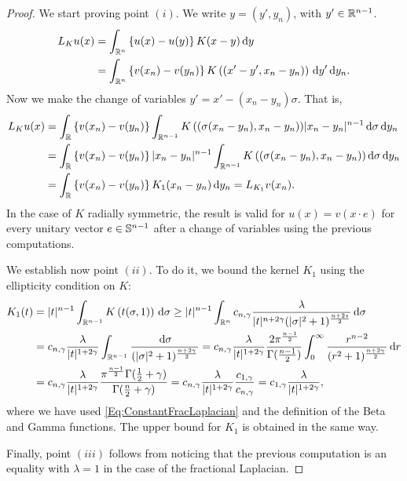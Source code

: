 \begin{proof}
	We start proving point $(i)$. We write $y=(y',y_n)$, with $y'\in \mathbb{R}^{n-1}$.
	\begin{align*}
	L_K u(x) &= \int_{\mathbb{R}^n} \left\{ u(x)-u(y) \right\} K(x-y) \,\mathrm{d} y \\
	&=\int_{\mathbb{R}^n} \left\{ v(x_n)-v(y_n) \right\} K\left((x'-y',x_n-y_n)\right) \,\mathrm{d} y' \,\mathrm{d} y_n.
	\end{align*}
	Now we make the change of variables $y' = x'-(x_n-y_n)\sigma$. That is,
	\begin{align*}
	L_K u(x) &= \int_{\mathbb{R}} \left\{ v(x_n)-v(y_n) \right\} \int_{\mathbb{R}^{n-1}} K\left((\sigma(x_n-y_n),x_n-y_n\right)) |x_n-y_n|^{n-1} \,\mathrm{d} \sigma \,\mathrm{d} y_n \\
	&= \int_{\mathbb{R}} \left\{ v(x_n)-v(y_n) \right\} |x_n-y_n|^{n-1} \int_{\mathbb{R}^{n-1}} K\left((\sigma(x_n-y_n),x_n-y_n\right)) \,\mathrm{d}\sigma \,\mathrm{d} y_n \\
	&= \int_{\mathbb{R}} \left\{ v(x_n)-v(y_n) \right\} K_1(x_n-y_n ) \,\mathrm{d} y_n = L_{K_1}v(x_n).
	\end{align*}
	In the case of $K$ radially symmetric, the result is valid for $u(x) = v(x\cdot e)$ for every unitary vector $e\in \mathbb{S}^{n-1}$ after a change of variables using the previous computations.
	
	We establish now point $(ii)$. To do it, we bound the kernel $K_1$ using the ellipticity condition on $K$:
	\begin{align*}
	K_1(t) &= |t|^{n-1} \int_{\mathbb{R}^{n-1}} K\left(t(\sigma,1)\right) \,\mathrm{d}\sigma \geq |t|^{n-1} \int_{\mathbb{R}^n} c_{n,\gamma} \frac{\lambda}{|t|^{n+2\gamma}(|\sigma|^2+1)^{\frac{n+2s}{2}}} \,\mathrm{d}\sigma \\
	&= c_{n,\gamma} \frac{\lambda}{|t|^{1+2\gamma}} \int_{\mathbb{R}^{n-1}} \frac{\,\mathrm{d}\sigma}{(|\sigma|^2+1)^{\frac{n+2\gamma}{2}}} = c_{n,\gamma} \frac{\lambda}{|t|^{1+2\gamma}} \dfrac{2 \pi^{\frac{n-1}{2}}}{\Gamma(\frac{n-1}{2})} \int_0^\infty \dfrac{r^{n-2}}{(r^2+1)^{\frac{n+2\gamma}{2}}} \,\mathrm{d} r \\	
	& = c_{n,\gamma} \frac{\lambda}{|t|^{1+2\gamma}} 
	\dfrac{\pi^{\frac{n-1}{2}} \Gamma(\frac{1}{2}+\gamma)}{\Gamma(\frac{n}{2}+\gamma)} 
	= c_{n,\gamma} \frac{\lambda}{|t|^{1+2\gamma}} \frac{c_{1,\gamma}}{c_{n,\gamma}} = c_{1,\gamma} \frac{\lambda}{|t|^{1+2\gamma}},
	\end{align*}
	where we have used \eqref{Eq:ConstantFracLaplacian} and the definition of the Beta and Gamma functions. The upper bound for $K_1$ is obtained in the same way.
	
	Finally, point $(iii)$ follows from noticing that the previous computation is an equality with $\lambda = 1$ in the case of the fractional Laplacian.
\end{proof}


